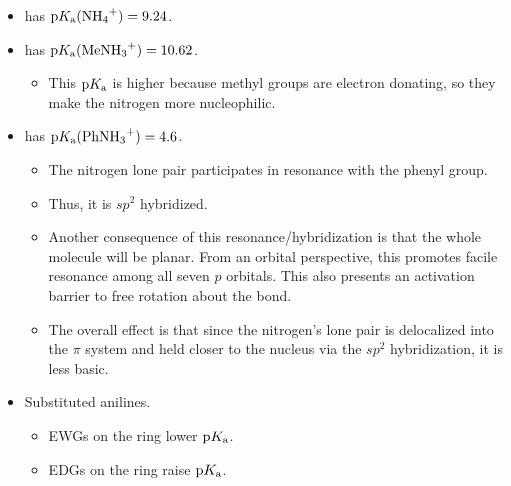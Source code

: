 \documentclass[../notes.tex]{subfiles}
\begin{document}
\begin{itemize}
    \begin{itemize}
        \item {} has $\pKa(\ce{NH4+})=9.24$.
        \item {} has $\pKa(\ce{MeNH3+})=10.62$.
        \begin{itemize}
            \item This $\text{p}K_\text{a}$ is higher because methyl groups are electron donating, so they make the nitrogen more nucleophilic.
        \end{itemize}
        \item {} has $\pKa(\ce{PhNH3+})=4.6$.
        \begin{itemize}
            \item The nitrogen lone pair participates in resonance with the phenyl group.
            \item Thus, it is $sp^2$ hybridized.
            \item Another consequence of this resonance/hybridization is that the whole molecule will be planar. From an orbital perspective, this promotes facile resonance among all seven $p$ orbitals. This also presents an activation barrier to free rotation about the  bond.
            \item The overall effect is that since the nitrogen's lone pair is delocalized into the $\pi$ system and held closer to the nucleus via the $sp^2$ hybridization, it is less basic.
        \end{itemize}
        \item Substituted anilines.
        \begin{itemize}
            \item EWGs on the ring lower $\text{p}K_\text{a}$.
            \item EDGs on the ring raise $\text{p}K_\text{a}$.
        \end{itemize}
    \end{itemize}
\end{itemize}
\end{document}
